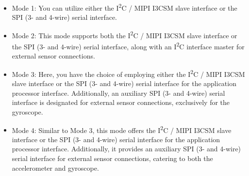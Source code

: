 \begin{itemize}
	\item Mode 1: You can utilize either the I\textsuperscript{2}C / MIPI I3CSM slave interface or the SPI (3- and 4-wire) serial interface.
	
	\item Mode 2: This mode supports both the I\textsuperscript{2}C / MIPI I3CSM slave interface or the SPI (3- and 4-wire) serial interface, along with an I\textsuperscript{2}C interface master for external sensor connections.
	
	\item Mode 3: Here, you have the choice of employing either the I\textsuperscript{2}C / MIPI I3CSM slave interface or the SPI (3- and 4-wire) serial interface for the application processor interface. Additionally, an auxiliary SPI (3- and 4-wire) serial interface is designated for external sensor connections, exclusively for the gyroscope.
	
	\item Mode 4: Similar to Mode 3, this mode offers the I\textsuperscript{2}C / MIPI I3CSM slave interface or the SPI (3- and 4-wire) serial interface for the application processor interface. Additionally, it provides an auxiliary SPI (3- and 4-wire) serial interface for external sensor connections, catering to both the accelerometer and gyroscope.	
	
\end{itemize}

